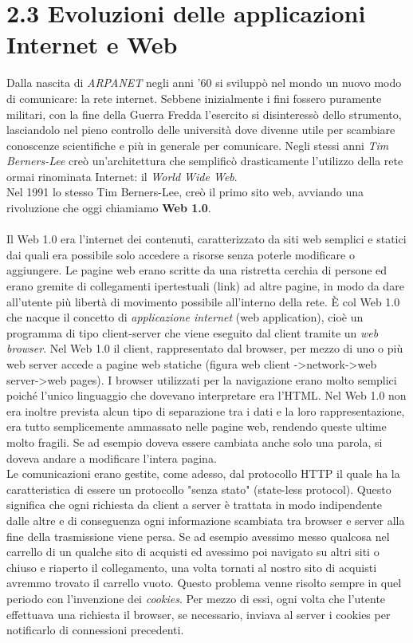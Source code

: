 \documentclass[a4paper, 11pt, oneside]{book}
\theoremstyle{plain}
\begin{document}
\section*{2.3 Evoluzioni delle applicazioni Internet e Web}
Dalla nascita di \textit{ARPANET} negli anni '60 si sviluppò nel mondo un nuovo modo di comunicare: la rete internet. Sebbene inizialmente i fini fossero puramente militari, con la fine della Guerra Fredda l'esercito si disinteressò dello strumento, lasciandolo nel pieno controllo delle università dove divenne utile per scambiare conoscenze scientifiche e più in generale per comunicare. Negli stessi anni \textit{Tim Berners-Lee} creò un'architettura che semplificò drasticamente l'utilizzo della rete ormai rinominata Internet: il\textit{ World Wide Web}.\\Nel 1991  lo stesso Tim Berners-Lee, creò il primo sito web, avviando una rivoluzione che oggi chiamiamo \textbf{Web 1.0}.\\\\
Il Web 1.0 era l'internet dei contenuti, caratterizzato da siti web semplici e statici dai quali era possibile solo accedere a risorse senza poterle modificare o aggiungere. Le pagine web erano scritte da una ristretta cerchia di persone ed erano gremite di collegamenti ipertestuali (link) ad altre pagine, in modo da dare all'utente più libertà di movimento possibile all'interno della rete. È col Web 1.0 che nacque il concetto di \textit{applicazione internet} (web application), cioè un programma di tipo client-server che viene eseguito dal client tramite un \textit{web browser}. Nel Web 1.0 il client, rappresentato dal browser, per mezzo di uno o più web server accede a pagine web statiche (figura web client ->network->web server->web pages). I browser utilizzati per la navigazione erano molto semplici poiché l'unico linguaggio che dovevano interpretare era l'HTML. Nel Web 1.0 non era inoltre prevista alcun tipo di separazione tra i dati e la loro rappresentazione, era tutto semplicemente ammassato nelle pagine web, rendendo queste ultime molto fragili. Se ad esempio doveva essere cambiata anche solo una parola, si doveva andare a modificare l'intera pagina.  \\Le comunicazioni erano gestite, come adesso, dal protocollo HTTP il quale ha la caratteristica di essere un protocollo "senza stato" (state-less protocol). Questo significa che ogni richiesta da client a server è trattata in modo indipendente dalle altre e di conseguenza ogni informazione scambiata tra browser e server alla fine della trasmissione viene persa. Se ad esempio avessimo messo qualcosa nel carrello di un qualche sito di acquisti ed avessimo poi navigato su altri siti o chiuso e riaperto il collegamento, una volta tornati al nostro sito di acquisti avremmo trovato il carrello vuoto. Questo problema venne risolto sempre in quel periodo con l'invenzione dei \textit{cookies}. Per mezzo di essi, ogni volta che l'utente effettuava una richiesta il browser, se necessario, inviava al server i cookies per notificarlo di connessioni precedenti.\\\\
\end{document}
